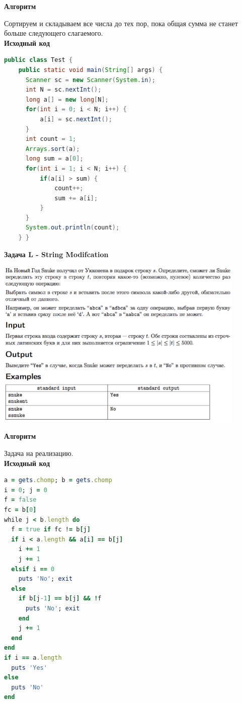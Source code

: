 \documentclass[a4paper,12pt]{article}
\begin{document}
\textbf{{\large Алгоритм}}

Сортируем и складываем все числа до тех пор, пока общая сумма не станет больше следующего слагаемого. \\

\textbf{{\large Исходный код}} \\
\begin{lstlisting}[language=Java]
public class Test {
    public static void main(String[] args) {        
      Scanner sc = new Scanner(System.in);
      int N = sc.nextInt();      
      long a[] = new long[N];      
      for(int i = 0; i < N; i++) {
          a[i] = sc.nextInt();
      }
      int count = 1;
      Arrays.sort(a);
      long sum = a[0];
      for(int i = 1; i < N; i++) {
          if(a[i] > sum) {
              count++;
              sum += a[i];
          }
      }
      System.out.println(count);      
    } }
\end{lstlisting}


\newpage
\textbf{{\large Задача L - String Modifcation}}

\begin{center}
\includegraphics[width=0.9\textwidth]{OC_Asia/L.png}\\ [1cm]
\end{center}

\textbf{{\large Алгоритм}}

Задача на реализацию. \\

\textbf{{\large Исходный код}} \\
\begin{lstlisting}[language=Ruby]
a = gets.chomp; b = gets.chomp
i = 0; j = 0
f = false
fc = b[0]
while j < b.length do
  f = true if fc != b[j]
  if i < a.length && a[i] == b[j]
    i += 1
    j += 1
  elsif i == 0
    puts 'No'; exit
  else
    if b[j-1] == b[j] && !f
      puts 'No'; exit
    end
    j += 1
  end
end
if i == a.length
  puts 'Yes'
else
  puts 'No'
end
\end{lstlisting}
\end{document}
